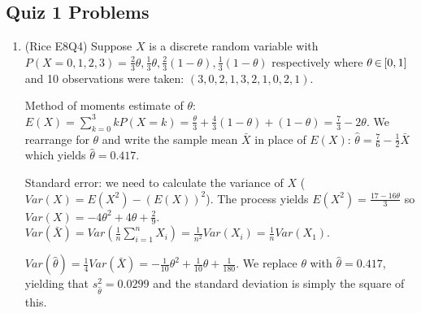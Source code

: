 \documentclass[letterpaper, 8pt]{extarticle}
\begin{document}
\begin{multicols*}{3}
	\section{Quiz 1 Problems}
	\begin{enumerate}[label=\alph*), wide, labelwidth=!, labelindent=0pt]
		\item (Rice E8Q4) Suppose $X$ is a discrete random variable with $P(X=0,1,2,3)=\frac{2}{3}\theta,\frac{1}{3}\theta,\frac{2}{3}(1-\theta),\frac{1}{3}(1-\theta)$ respectively where $\theta\,{\in}\,[0,1]$ and 10 observations were taken: $(3,0,2,1,3,2,1,0,2,1)$. 
		
		Method of moments estimate of $\theta$: $E(X)=\sum_{k=0}^3kP(X=k)=\frac{\theta}{3}+\frac{4}{3}(1-\theta)+(1-\theta)=\frac{7}{3}-2\theta$. We rearrange for $\theta$ and write the sample mean $\bar X$ in place of $E(X)$: $\hat\theta=\frac{7}{6}-\frac{1}{2}\bar X$ which yields $\hat\theta=0.417$.
		
		Standard error: we need to calculate the variance of $X$ ($Var(X)=E(X^2)-(E(X))^2$). The process yields $E(X^2)=\frac{17-16\theta}{3}$ so $Var(X)=-4\theta^2+4\theta+\frac{2}{9}$. $Var(\bar X)=Var(\frac{1}{n}\sum_{i=1}^nX_i)=\frac{1}{n^2}Var(X_i)=\frac{1}{n}Var(X_1)$. 
		
		$Var(\hat\theta)=\frac{1}{4}Var(\bar X)=-\frac{1}{10}\theta^2+\frac{1}{10}\theta+\frac{1}{180}$. We replace $\theta$ with $\hat\theta=0.417$, yielding that $s_{\hat\theta}^2=0.0299$ and the standard deviation is simply the square of this.
	\end{enumerate}
\end{multicols*}
\end{document}
